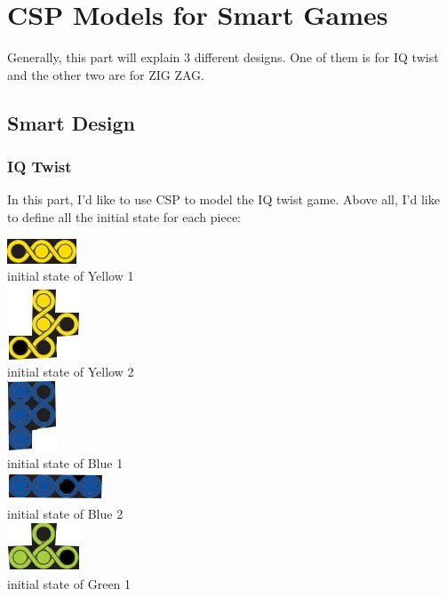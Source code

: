 \chapter{CSP Models for Smart Games}
\label{cha:design}
Generally, this part will explain 3 different designs. One of them is for IQ twist and the other two are for ZIG ZAG. 
\section{Smart Design}
\label{sec:des-hotpath}
\subsection{IQ Twist}
In this part, I'd like to use CSP to model the IQ twist game. Above all, I'd like to define all the initial state for each piece:
\begin{center}
\includegraphics{figs/yellow1.jpg} 
\\initial state of Yellow 1
\\\includegraphics{figs/yellow2.jpg}
\\initial state of Yellow 2
\\\includegraphics{figs/blue1.jpg}
\\initial state of Blue 1
\\\includegraphics{figs/blue2.jpg}
\\initial state of Blue 2
\\\includegraphics{figs/green1.jpg}
\\initial state of Green 1 

\end{center}
